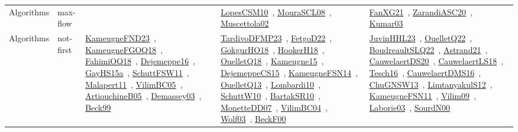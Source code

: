 {\begin{longtable}{lp{3cm}>{\raggedright\arraybackslash}p{6cm}>{\raggedright\arraybackslash}p{6cm}>{\raggedright\arraybackslash}p{8cm}}
Algorithms & max-flow &  & \href{works/LopesCSM10.pdf}{LopesCSM10}~\cite{LopesCSM10}, \href{works/MouraSCL08.pdf}{MouraSCL08}~\cite{MouraSCL08}, \href{works/Muscettola02.pdf}{Muscettola02}~\cite{Muscettola02} & \href{works/FanXG21.pdf}{FanXG21}~\cite{FanXG21}, \href{works/ZarandiASC20.pdf}{ZarandiASC20}~\cite{ZarandiASC20}, \href{works/Kumar03.pdf}{Kumar03}~\cite{Kumar03}\\
Algorithms & not-first & \href{works/KameugneFND23.pdf}{KameugneFND23}~\cite{KameugneFND23}, \href{works/KameugneFGOQ18.pdf}{KameugneFGOQ18}~\cite{KameugneFGOQ18}, \href{works/FahimiOQ18.pdf}{FahimiOQ18}~\cite{FahimiOQ18}, \href{works/Dejemeppe16.pdf}{Dejemeppe16}~\cite{Dejemeppe16}, \href{works/GayHS15a.pdf}{GayHS15a}~\cite{GayHS15a}, \href{works/SchuttFSW11.pdf}{SchuttFSW11}~\cite{SchuttFSW11}, \href{works/Malapert11.pdf}{Malapert11}~\cite{Malapert11}, \href{works/VilimBC05.pdf}{VilimBC05}~\cite{VilimBC05}, \href{works/ArtiouchineB05.pdf}{ArtiouchineB05}~\cite{ArtiouchineB05}, \href{works/Demassey03.pdf}{Demassey03}~\cite{Demassey03}, \href{works/Beck99.pdf}{Beck99}~\cite{Beck99} & \href{works/TardivoDFMP23.pdf}{TardivoDFMP23}~\cite{TardivoDFMP23}, \href{works/FetgoD22.pdf}{FetgoD22}~\cite{FetgoD22}, \href{works/GokgurHO18.pdf}{GokgurHO18}~\cite{GokgurHO18}, \href{works/HookerH18.pdf}{HookerH18}~\cite{HookerH18}, \href{works/OuelletQ18.pdf}{OuelletQ18}~\cite{OuelletQ18}, \href{works/Kameugne15.pdf}{Kameugne15}~\cite{Kameugne15}, \href{works/DejemeppeCS15.pdf}{DejemeppeCS15}~\cite{DejemeppeCS15}, \href{works/KameugneFSN14.pdf}{KameugneFSN14}~\cite{KameugneFSN14}, \href{works/OuelletQ13.pdf}{OuelletQ13}~\cite{OuelletQ13}, \href{works/Lombardi10.pdf}{Lombardi10}~\cite{Lombardi10}, \href{works/SchuttW10.pdf}{SchuttW10}~\cite{SchuttW10}, \href{works/BartakSR10.pdf}{BartakSR10}~\cite{BartakSR10}, \href{works/MonetteDD07.pdf}{MonetteDD07}~\cite{MonetteDD07}, \href{works/VilimBC04.pdf}{VilimBC04}~\cite{VilimBC04}, \href{works/Wolf03.pdf}{Wolf03}~\cite{Wolf03}, \href{works/BeckF00.pdf}{BeckF00}~\cite{BeckF00} & \href{works/JuvinHHL23.pdf}{JuvinHHL23}~\cite{JuvinHHL23}, \href{works/OuelletQ22.pdf}{OuelletQ22}~\cite{OuelletQ22}, \href{works/BoudreaultSLQ22.pdf}{BoudreaultSLQ22}~\cite{BoudreaultSLQ22}, \href{works/Astrand21.pdf}{Astrand21}~\cite{Astrand21}, \href{works/CauwelaertDS20.pdf}{CauwelaertDS20}~\cite{CauwelaertDS20}, \href{works/CauwelaertLS18.pdf}{CauwelaertLS18}~\cite{CauwelaertLS18}, \href{works/Tesch16.pdf}{Tesch16}~\cite{Tesch16}, \href{works/CauwelaertDMS16.pdf}{CauwelaertDMS16}~\cite{CauwelaertDMS16}, \href{works/ChuGNSW13.pdf}{ChuGNSW13}~\cite{ChuGNSW13}, \href{works/LimtanyakulS12.pdf}{LimtanyakulS12}~\cite{LimtanyakulS12}, \href{works/KameugneFSN11.pdf}{KameugneFSN11}~\cite{KameugneFSN11}, \href{works/Vilim09.pdf}{Vilim09}~\cite{Vilim09}, \href{works/Laborie03.pdf}{Laborie03}~\cite{Laborie03}, \href{works/SourdN00.pdf}{SourdN00}~\cite{SourdN00}\\

\end{longtable}}
